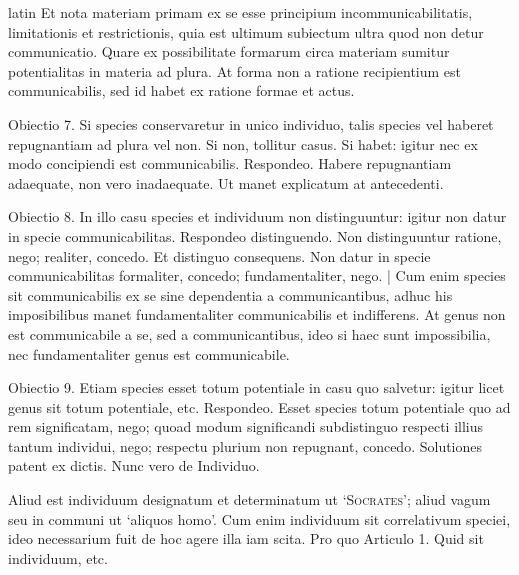 \begin{otherlanguage*}{latin}
\pstart
 Et nota materiam primam ex se esse principium incommunicabilitatis, limitationis et restrictionis, quia est ultimum subiectum ultra quod non detur communicatio. Quare ex possibilitate formarum circa materiam sumitur potentialitas in materia ad plura. At forma non a ratione recipientium est communicabilis, sed id habet ex ratione formae et actus. 
\pend

\pstart
 Obiectio 7. Si species conservaretur in unico individuo, talis species vel haberet repugnantiam ad plura vel non. Si non, tollitur casus. Si habet: igitur nec ex modo concipiendi est communicabilis. Respondeo. Habere repugnantiam adaequate, non vero inadaequate. Ut manet explicatum at antecedenti. 
\pend

\pstart
 Obiectio 8. In illo casu species et individuum non distinguuntur: igitur non datur in specie communicabilitas. Respondeo distinguendo. Non distinguuntur ratione, nego; realiter, concedo. Et distinguo consequens. Non datur in specie communicabilitas formaliter, concedo; fundamentaliter, nego. \textnormal{|}   Cum enim species sit communicabilis ex se sine dependentia a communicantibus, adhuc his imposibilibus manet fundamentaliter communicabilis et indifferens. At genus non est communicabile a se, sed a communicantibus, ideo si haec sunt impossibilia, nec fundamentaliter genus est communicabile. 
\pend

\pstart
 Obiectio 9. Etiam species esset totum potentiale in casu quo salvetur: igitur licet genus sit totum potentiale, etc. Respondeo. Esset species totum potentiale quo  ad rem significatam, nego; quoad modum significandi subdistinguo respecti illius tantum individui, nego; respectu plurium non repugnant, concedo. Solutiones patent ex dictis. Nunc vero de Individuo. 
\pend

        \pstart
        \pend
      
\pstart
 Aliud est individuum designatum et determinatum ut \textsc{`Socrates'}; aliud vagum seu in communi ut `aliquos homo'. Cum enim individuum sit correlativum speciei, ideo necessarium fuit de hoc agere illa iam scita. Pro quo Articulo 1. Quid sit individuum, etc. 
\pend

        \pstart
        \pend
      

\end{otherlanguage*}
